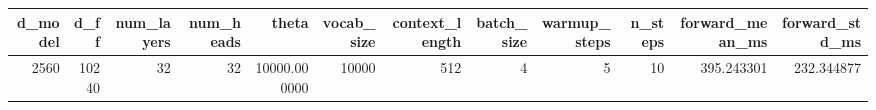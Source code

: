 \begin{tabular}{rrrrrrrrrrrr}
\toprule
d_model & d_ff & num_layers & num_heads & theta & vocab_size & context_length & batch_size & warmup_steps & n_steps & forward_mean_ms & forward_std_ms \\
\midrule
2560 & 10240 & 32 & 32 & 10000.000000 & 10000 & 512 & 4 & 5 & 10 & 395.243301 & 232.344877 \\
\bottomrule
\end{tabular}
